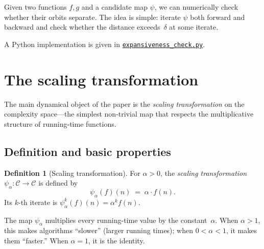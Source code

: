 \documentclass[11pt,a4paper]{article}
\newcommand{\repourl}{https://github.com/gabayae/expansive-homeomorphisms-complexity-qmetric}
\theoremstyle{plain}
\theoremstyle{definition}
\newtheorem{definitioninner}[theoreminner]{Definition}
\newenvironment{definition}[1][]{\begin{definitioninner}[#1]}{\end{definitioninner}}
\newcommand{\C}{\mathcal{C}}
\begin{document}
Given two functions $f,g$ and a candidate map $\psi$, we can
numerically check whether their orbits separate.  The idea is simple:
iterate $\psi$ both forward and backward and check whether the
distance exceeds~$\delta$ at some iterate.

\begin{algorithm}[H]
\DontPrintSemicolon
\SetAlgoLined
{}
\;
\caption{Check expansive separation}
\label{alg:check-exp}
\end{algorithm}

A Python implementation is given in
\href{\repourl/blob/main/code/python/expansiveness_check.py}{\texttt{expansiveness\_check.py}}.


\section{The scaling transformation}
\label{sec:scaling}

The main dynamical object of the paper is the \emph{scaling
transformation} on the complexity space---the simplest non-trivial
map that respects the multiplicative structure of running-time
functions.

\subsection{Definition and basic properties}

\begin{definition}[Scaling transformation]\label{def:scaling}
For $\alpha>0$, the \emph{scaling transformation}
$\psi_\alpha\colon\C\to\C$ is defined by
\[
  \psi_\alpha(f)(n) \;=\; \alpha\cdot f(n).
\]
Its $k$-th iterate is $\psi_\alpha^k(f)(n)=\alpha^k f(n)$.
\end{definition}

The map $\psi_\alpha$ multiplies every running-time value by the
constant~$\alpha$.  When $\alpha>1$, this makes algorithms
``slower'' (larger running times); when $0<\alpha<1$, it makes them
``faster.''  When $\alpha=1$, it is the identity.
\end{document}
